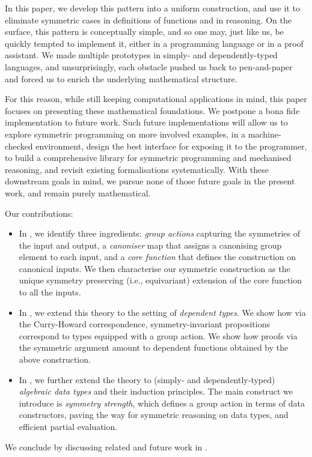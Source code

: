 In this paper, we develop this pattern into a uniform construction, and
use it to eliminate symmetric cases in definitions of functions and in reasoning.
On the surface, this pattern is conceptually simple, and so one may,
just like us, be quickly tempted to implement it, either in a
programming language or in a proof assistant. We made multiple
prototypes in simply- and dependently-typed languages, and
unsurprisingly, each obstacle pushed us back to pen-and-paper and
forced us to enrich the underlying mathematical structure.

For this reason, while still keeping computational applications in
mind, this paper focuses on presenting these mathematical foundations.
We postpone a bona fide implementation to future work. Such future
implementations will allow us to explore symmetric programming on more
involved examples, in a machine-checked environment, design the best
interface for exposing it to the programmer, to build a comprehensive
library for symmetric programming and mechanised reasoning, and
revisit existing \WLOG formalisations systematically. With these
downstream goals in mind, we pursue none of those future goals in the
present work, and remain purely mathematical.

Our contributions:
\begin{itemize}
  \item In , we identify three ingredients:
    \emph{group actions} capturing the symmetries of the input and
    output, a \emph{canoniser} map that assigns a canonising group
    element to each input, and a \emph{core function} that defines the
    construction on canonical inputs. We then characterise our symmetric \WLOG{}
    construction as the unique symmetry
    preserving (i.e., equivariant) extension of the core function to all the inputs.
  \item In , we extend this theory to the
    setting of \emph{dependent types}. We show how via
    the Curry-Howard correspondence, symmetry-invariant propositions
    correspond to types equipped with a group action. We show how proofs
    via the symmetric \WLOG{} argument amount to dependent functions obtained by
    the above construction.
  \item In , we further extend the theory
    to (simply- and dependently-typed) \emph{algebraic data types} and
    their induction principles. The main construct we introduce is
    \emph{symmetry strength}, which defines a group action in terms of
    data constructors, paving the way for symmetric reasoning on data types,
    and efficient partial evaluation.
\end{itemize}
%
We conclude by discussing related and future work in .

